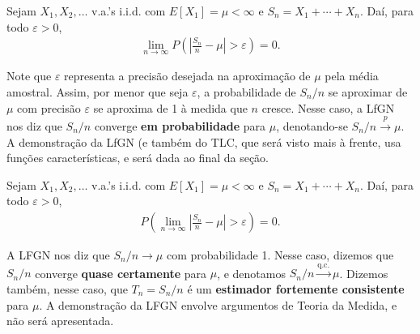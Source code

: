 \documentclass[../Notas.tex]{subfiles}
\begin{document}
\begin{proposition}
Sejam $X_1, X_2, \dots$ v.a.'s i.i.d. com $E[X_1] = \mu < \infty$ e $S_n = X_1 + \cdots + X_n$. Daí, para todo $\varepsilon > 0$,
\begin{align*}
    \lim_{n\to\infty} P\left( \left| \frac{S_n}{n} - \mu \right| > \varepsilon \right) = 0.
\end{align*}
\end{proposition}

Note que $\varepsilon$ representa a precisão desejada na aproximação de $\mu$ pela média amostral. Assim, por menor que seja $\varepsilon$, a probabilidade de $S_n/n$ se aproximar de $\mu$ com precisão $\varepsilon$ se aproxima de 1 à medida que $n$ cresce. Nesse caso, a LfGN nos diz que $S_n/n$ converge \textbf{em probabilidade} para $\mu$, denotando-se $S_n/n\xrightarrow{p}\mu$. A demonstração da LfGN (e também do TLC, que será visto mais à frente, usa funções características, e será dada ao final da seção.

\begin{proposition}
Sejam $X_1, X_2, \dots$ v.a.'s i.i.d. com $E[X_1] = \mu < \infty$ e $S_n = X_1 + \cdots + X_n$. Daí, para todo $\varepsilon > 0$,
\begin{align*}
    P\left(\lim_{n\to\infty} \left| \frac{S_n}{n} - \mu \right| > \varepsilon \right) = 0.
\end{align*}
\end{proposition}

A LFGN nos diz que $S_n/n\to\mu$ com probabilidade 1. Nesse caso, dizemos que $S_n/n$ converge \textbf{quase certamente} para $\mu$, e denotamos $S_n/n\xrightarrow{\text{q.c.}} \mu$. Dizemos também, nesse caso, que $T_n = S_n/n$ é um \textbf{estimador fortemente consistente} para $\mu$. A demonstração da LFGN envolve argumentos de Teoria da Medida, e não será apresentada.
\end{document}
